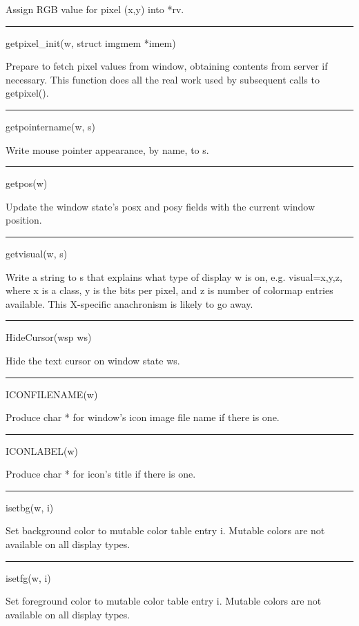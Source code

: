 Assign RGB value for pixel (x,y) into *rv.


\bigskip\hrule\vspace{0.1cm}
\noindent
getpixel\_init(w, struct imgmem *imem)


Prepare to fetch pixel values from window, obtaining contents from
server if necessary. This function does all the real work used by
subsequent calls to getpixel().


\bigskip\hrule\vspace{0.1cm}
\noindent
getpointername(w, s)


Write mouse pointer appearance, by name, to s.


\bigskip\hrule\vspace{0.1cm}
\noindent
getpos(w)


Update the window state's posx and posy fields with the current window position.


\bigskip\hrule\vspace{0.1cm}
\noindent
getvisual(w, s)


Write a string to s that explains what type of display w is on,
e.g. {\textquotedbl}visual=x,y,z{\textquotedbl}, where x is a class, y
is the bits per pixel, and z is number of colormap entries
available. This X-specific anachronism is likely to go away.


\bigskip\hrule\vspace{0.1cm}
\noindent
HideCursor(wsp ws)


Hide the text cursor on window state ws.


\bigskip\hrule\vspace{0.1cm}
\noindent
ICONFILENAME(w)


Produce char * for window's icon image file name if there is one.


\bigskip\hrule\vspace{0.1cm}
\noindent
ICONLABEL(w)


Produce char * for icon's title if there is one.


\bigskip\hrule\vspace{0.1cm}
\noindent
isetbg(w, i)


Set background color to mutable color table entry i. Mutable colors
are not available on all display types.


\bigskip\hrule\vspace{0.1cm}
\noindent
isetfg(w, i)


Set foreground color to mutable color table entry i. Mutable colors
are not available on all display types.


